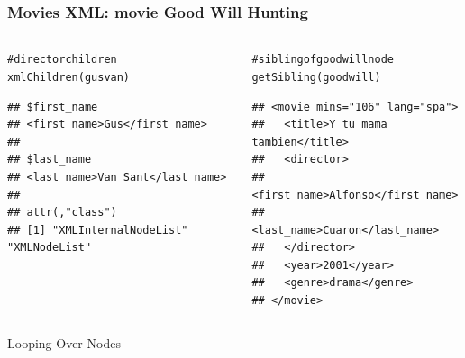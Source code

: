 \documentclass{beamer}\usepackage[]{graphicx}\usepackage[]{color}
\makeatletter
\newcommand{\hlcom}[1]{\textcolor[rgb]{0.588,0.588,0.588}{#1}}%
\newcommand{\hlstd}[1]{\textcolor[rgb]{0.196,0.196,0.196}{#1}}%
\newcommand{\hlkwd}[1]{\textcolor[rgb]{0.78,0.227,0.412}{#1}}%
\newenvironment{kframe}{%
 \def\at@end@of@kframe{}%
 \ifinner\ifhmode%
  \def\at@end@of@kframe{\end{minipage}}%
  \begin{minipage}{\columnwidth}%
 \fi\fi%
 \def\FrameCommand##1{\hskip\@totalleftmargin \hskip-\fboxsep
 \colorbox{shadecolor}{##1}\hskip-\fboxsep
     \hskip-\linewidth \hskip-\@totalleftmargin \hskip\columnwidth}%
 \MakeFramed {\advance\hsize-\width
   \@totalleftmargin\z@ \linewidth\hsize
   \@setminipage}}%
 {\par\unskip\endMakeFramed%
 \at@end@of@kframe}
\newenvironment{knitrout}{}{} %
\makeatother
\begin{document}

\begin{frame}[fragile]
\frametitle{Movies XML: movie Good Will Hunting}

\begin{columns}[t]
\begin{column}{0.5\textwidth}
\begin{knitrout}\tiny
{}\color{fgcolor}\begin{kframe}
\begin{alltt}
\hlcom{# director children}
\hlkwd{xmlChildren}\hlstd{(gusvan)}
\end{alltt}
\begin{verbatim}
## $first_name
## <first_name>Gus</first_name> 
## 
## $last_name
## <last_name>Van Sant</last_name> 
## 
## attr(,"class")
## [1] "XMLInternalNodeList" "XMLNodeList"
\end{verbatim}
\end{kframe}
\end{knitrout}
\end{column}

\begin{column}{0.5\textwidth}
\begin{knitrout}\tiny
{}\color{fgcolor}\begin{kframe}
\begin{alltt}
\hlcom{# sibling of goodwill node}
\hlkwd{getSibling}\hlstd{(goodwill)}
\end{alltt}
\begin{verbatim}
## <movie mins="106" lang="spa">
##   <title>Y tu mama tambien</title>
##   <director>
##     <first_name>Alfonso</first_name>
##     <last_name>Cuaron</last_name>
##   </director>
##   <year>2001</year>
##   <genre>drama</genre>
## </movie>
\end{verbatim}
\end{kframe}
\end{knitrout}
\end{column}
\end{columns}

\end{frame}


\begin{frame}
 \begin{center}
  {\Huge \textcolor{mandarina}{Looping Over Nodes}}
 \end{center}
\end{frame}
\end{document}
